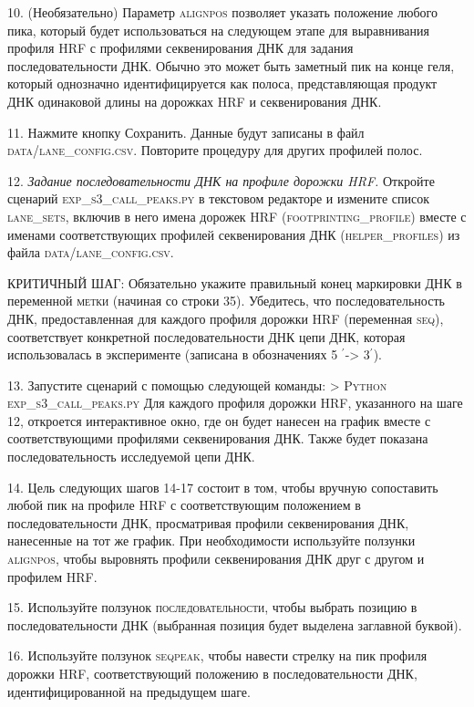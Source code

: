     10. (Необязательно) Параметр \textsc{alignpos} позволяет указать положение любого пика, который будет использоваться на следующем этапе для выравнивания профиля HRF с профилями секвенирования ДНК для задания последовательности ДНК. Обычно это может быть заметный пик на конце геля, который однозначно идентифицируется как полоса, представляющая продукт ДНК одинаковой длины на дорожках HRF и секвенирования ДНК.

    11. Нажмите кнопку Сохранить. Данные будут записаны в файл \textsc{data/lane\_config.csv}. Повторите процедуру для других профилей полос.
    

    12.     \emph{Задание последовательности ДНК на профиле дорожки HRF.}  Откройте сценарий \textsc{exp\_s3\_call\_peaks.py} в текстовом редакторе и измените список \textsc{lane\_sets}, включив в него имена дорожек HRF (\textsc{footprinting\_profile}) вместе с именами соответствующих профилей секвенирования ДНК (\textsc{helper\_profiles}) из файла \textsc{data/lane\_config.csv}.

    КРИТИЧНЫЙ ШАГ: Обязательно укажите правильный конец маркировки ДНК в переменной \textsc{метки} (начиная со строки 35). Убедитесь, что последовательность ДНК, предоставленная для каждого профиля дорожки HRF (переменная \textsc{seq}), соответствует конкретной последовательности ДНК цепи ДНК, которая использовалась в эксперименте (записана в обозначениях 5 $^\prime$-> 3$^\prime$).
    
    13. Запустите сценарий с помощью следующей команды:
    \textsc{> Python exp\_s3\_call\_peaks.py}
    Для каждого профиля дорожки HRF, указанного на шаге 12, откроется интерактивное окно, где он будет нанесен на график вместе с соответствующими профилями секвенирования ДНК. Также будет показана последовательность исследуемой цепи ДНК.

    14. Цель следующих шагов 14-17 состоит в том, чтобы вручную сопоставить любой пик на профиле HRF с соответствующим положением в последовательности ДНК, просматривая профили секвенирования ДНК, нанесенные на тот же график. При необходимости используйте ползунки \textsc{alignpos}, чтобы выровнять профили секвенирования ДНК друг с другом и профилем HRF.
    
    15. Используйте ползунок \textsc{последовательности}, чтобы выбрать позицию в последовательности ДНК (выбранная позиция будет выделена заглавной буквой).

    16. Используйте ползунок \textsc{seqpeak}, чтобы навести стрелку на пик профиля дорожки HRF, соответствующий положению в последовательности ДНК, идентифицированной на предыдущем шаге.
    

